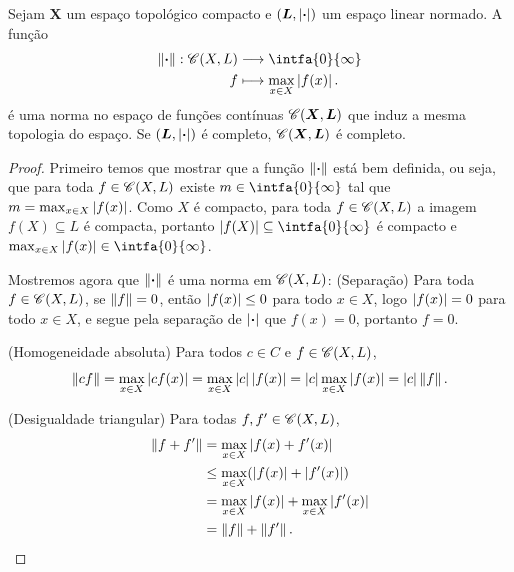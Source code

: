 \begin{prop}
Sejam $\bm X$ um espaço topológico compacto e $(\bm L,\left\vert{\bm{\cdot}}\right\vert)$ um espaço linear normado. A função
	\begin{align*}
	\func{\nor{\var}}{\cont(X,L)}{\intfa{0}{\infty}}{f}{\max_{x \in X} \abs{f(x)}.}
	\end{align*}
é uma norma no espaço de funções contínuas $\mathscr{C}(\bm X,\bm L)$ que induz a mesma topologia do espaço. Se $(\bm L,\left\vert{\bm{\cdot}}\right\vert)$ é completo, $\mathscr{C}(\bm X,\bm L)$ é completo.
\end{prop}
\begin{proof}
Primeiro temos que mostrar que a função $\left\Vert{\bm{\cdot}}\right\Vert$ está bem definida, ou seja, que para toda $f \in \mathscr{C}(X,L)$ existe $m \in \intfa{0}{\infty}$ tal que $m = \max_{x \in X} \left\vert{f(x)}\right\vert$. Como $X$ é compacto, para toda $f \in \mathscr{C}(X,L)$ a imagem $f(X) \subseteq L$ é compacta, portanto $\abs{f(X)} \subseteq \intfa{0}{\infty}$ é compacto e $\max_{x \in X} \abs{f(x)} \in \intfa{0}{\infty}$.

Mostremos agora que $\left\Vert{\bm{\cdot}}\right\Vert$ é uma norma em $\mathscr{C}(X,L)$: (Separação) Para toda $f \in \mathscr{C}(X,L)$, se $\left\Vert{f}\right\Vert = 0$, então $\left\vert{f(x)}\right\vert \leq 0$ para todo $x \in X$, logo $\left\vert{f(x)}\right\vert = 0$ para todo $x \in X$, e segue pela separação de $\left\vert{\bm{\cdot}}\right\vert$ que $f(x)=0$, portanto $f=0$.

(Homogeneidade absoluta) Para todos $c \in C$ e $f \in \mathscr{C}(X,L)$,
	\begin{equation*}
	\left\Vert{cf}\right\Vert = \max_{x \in X} \left\vert{cf(x)}\right\vert = \max_{x \in X} \left\vert{c}\right\vert\left\vert{f(x)}\right\vert = \left\vert{c}\right\vert \max_{x \in X} \left\vert{f(x)}\right\vert = \left\vert{c}\right\vert\left\Vert{f}\right\Vert.
	\end{equation*}

(Desigualdade triangular) Para todas $f,f' \in \mathscr{C}(X,L)$,
	\begin{align*}
	\left\Vert{f+f'}\right\Vert &= \max_{x \in X} \left\vert{f(x)+f'(x)}\right\vert \\
		&\leq \max_{x \in X}(\left\vert{f(x)}\right\vert + \left\vert{f'(x)}\right\vert) \\
		&= \max_{x \in X} \left\vert{f(x)}\right\vert + \max_{x \in X} \left\vert{f'(x)}\right\vert \\
		&= \left\Vert{f}\right\Vert+\left\Vert{f'}\right\Vert.
	\end{align*}



\end{proof}
